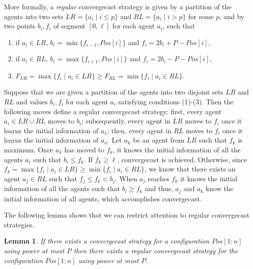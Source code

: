 \documentclass{article}
\newtheorem{lemma}{Lemma}
\newcommand\convergecast{convergecast\xspace}
\begin{document}
More formally, a \emph{regular} convergecast strategy is given by a partition of the agents into two sets $LR = \{a_i
\mid i \leq p\}$ and $RL = \{a_i \mid i > p\}$ for some $p$, and by two points $b_i, f_i$ of segment $[0, \ell]$
for each
agent $a_i$,
such that
\begin{enumerate}[(1)]
\item if $a_i \in LR$, $b_i = \min \{f_{i-1},Pos[i]\}$ and
  $f_i= 2b_i+P-Pos[i]$,
\item if $a_i \in RL$, $b_i = \max \{f_{i+1},Pos[i]\}$ and $f_i =
  2b_i-P-Pos[i]$, 
\item $F_{LR} = \max \{f_i \mid a_i \in LR\} \geq F_{RL} = \min\{f_i
  \mid a_i \in RL\}$.
\end{enumerate}



Suppose that we are given a partition of the agents into two
disjoint sets $LR$ and $RL$ and values $b_i, f_i$ for each
agent $a_i$ satisfying conditions (1)-(3). Then the following moves define a regular convergecast strategy: first, every agent $a_i \in LR \cup RL$ moves to $b_i$;
subsequently, every agent in $LR$ moves to $f_i$ once it learns the initial
information of $a_1$; then, every agent in $RL$ moves to $f_i$ once
it learns the initial information of $a_n$.  Let $a_k$ be an agent from $LR$
such that $f_k$ is maximum. Once $a_k$ has moved to $f_k$, it knows
the initial information of all the agents $a_i$ such that $b_i \leq
f_k$. If $f_k \geq \ell$, {\convergecast} is achieved. Otherwise,
since $f_k = \max \{f_i \mid a_i \in LR\} \geq \min\{f_i \mid a_i \in
RL\}$, we know that there exists an agent $a_j \in RL$ such that $f_j
\leq f_k < b_j$.  When $a_j$ reaches $f_k$ it knows the initial
information of all the agents such that $b_i \geq f_k$ and thus, $a_j$
and $a_k$ know the initial information of all agents, which accomplishes convergecast.

The following lemma shows that we can restrict attention to regular convergecast strategies.


\begin{lemma}\label{lem:regconv}
If there exists a {\convergecast} strategy for a configuration
$Pos[1:n]$ using power at most $P$ then there exists a regular convergecast strategy for the configuration
$Pos[1:n]$ using power at most $P$.
\end{lemma}
\end{document}
